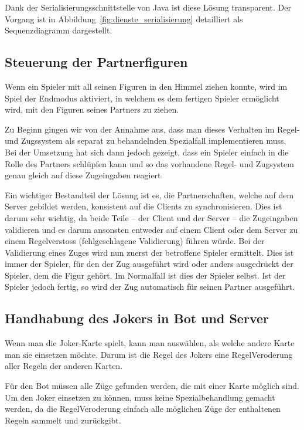 \documentclass[12pt,halfparskip]{scrartcl}
\begin{document}
Dank der Serialisierungsschnittstelle von Java ist diese Lösung transparent. Der Vorgang ist in Abbildung~\vref{fig:dienste_serialisierung} detailliert als Sequenzdiagramm dargestellt.

\subsection{Steuerung der Partnerfiguren}

Wenn ein Spieler mit all seinen Figuren in den Himmel ziehen konnte, wird im Spiel der Endmodus aktiviert, in welchem es dem fertigen Spieler ermöglicht wird, mit den Figuren seines Partners zu ziehen.

Zu Beginn gingen wir von der Annahme aus, dass man dieses Verhalten im Regel- und Zugssystem als separat zu behandelnden Spezialfall implementieren muss. Bei der Umsetzung hat sich dann jedoch gezeigt, dass ein Spieler einfach in die Rolle des Partners schlüpfen kann und so das vorhandene Regel- und Zugsystem genau gleich auf diese Zugeingaben reagiert.

Ein wichtiger Bestandteil der Lösung ist es, die Partnerschaften, welche auf dem Server gebildet werden, konsistent auf die Clients zu synchronisieren. Dies ist darum sehr wichtig, da beide Teile -- der Client und der Server -- die Zugeingaben validieren und es darum ansonsten entweder auf einem Client oder dem Server zu einem Regelverstoss (fehlgeschlagene Validierung) führen würde. Bei der Validierung eines Zuges wird nun zuerst der betroffene Spieler ermittelt. Dies ist immer der Spieler, für den der Zug ausgeführt wird oder anders ausgedrückt der Spieler, dem die Figur gehört. Im Normalfall ist dies der Spieler selbst. Ist der Spieler jedoch fertig, so wird der Zug automatisch für seinen Partner ausgeführt.

\subsection{Handhabung des Jokers in Bot und Server}

Wenn man die Joker-Karte spielt, kann man auswählen, als welche andere Karte man sie einsetzen möchte. Darum ist die Regel des Jokers eine RegelVeroderung aller Regeln der anderen Karten.

Für den Bot müssen alle Züge gefunden werden, die mit einer Karte möglich sind. Um den Joker einsetzen zu können, muss keine Spezialbehandlung gemacht werden, da die RegelVeroderung einfach alle möglichen Züge der enthaltenen Regeln sammelt und zurückgibt.
\end{document}
